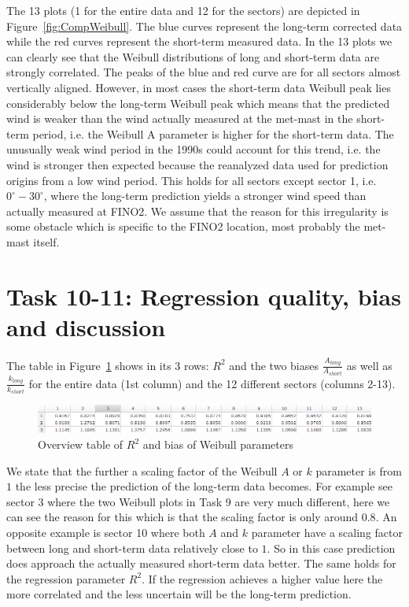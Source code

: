 \documentclass[10pt]{article}
\begin{document}
The 13 plots (1 for the entire data and 12 for the sectors) are depicted in Figure~\ref{fig:CompWeibull}. The blue curves represent the long-term corrected data while the red curves represent the short-term measured data. In the 13 plots we can clearly see that the Weibull distributions of long and short-term data are strongly correlated. The peaks of the blue and red curve are for all sectors almost vertically aligned. However, in most cases the short-term data Weibull peak lies considerably below the long-term Weibull peak which means that the predicted wind is weaker than the wind actually measured at the met-mast in the short-term period, i.e. the Weibull A parameter is higher for the short-term data. The unusually weak wind period in the 1990s could account for this trend, i.e. the wind is stronger then expected because the reanalyzed data used for prediction origins from a low wind period. This holds for all sectors except sector 1, i.e. $0^{\circ}-30^{\circ}$, where the long-term prediction yields a stronger wind speed than actually measured at FINO2. We assume that the reason for this irregularity is some obstacle which is specific to the FINO2 location, most probably the met-mast itself.

\section{Task 10-11: Regression quality, bias and discussion}
The table in Figure~\ref{fig:overview} shows in its 3 rows: $R^2$ and the two biases $\frac{A_{long}}{A_{short}}$ as well as $\frac{k_{long}}{k_{short}}$ for the entire data (1st column) and the 12 different sectors (columns 2-13). 

\begin{figure}[H]
\centering
  \includegraphics[width=1\linewidth]{../figures/overview.jpg}
  \caption{Overview table of $R^2$ and bias of Weibull parameters}
  \label{fig:overview}
\end{figure}

We state that the further a scaling factor of the Weibull $A$ or $k$ parameter is from $1$ the less precise the prediction of the long-term data becomes. For example see sector 3 where the two Weibull plots in Task 9 are very much different, here we can see the reason for this which is that the scaling factor is only around $0.8$. An opposite example is sector 10 where both $A$ and $k$ parameter have a scaling factor between long and short-term data relatively close to $1$. So in this case prediction does approach the actually measured short-term data better. The same holds for the regression parameter $R^2$. If the regression achieves a higher value here the more correlated and the less uncertain will be the long-term prediction.
\end{document}
